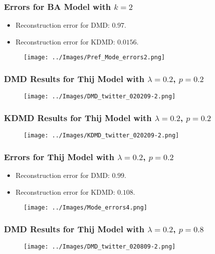 \documentclass{beamer}
\begin{document}
\begin{frame}
    \frametitle{Errors for BA Model with $k=2$}
    \begin{itemize}
        \item  Reconstruction error for DMD: $0.97$. 
        \item  Reconstruction error for KDMD: $0.0156$.
    \end{itemize}
   
    \begin{figure}
        \texttt{[image: ../Images/Pref\_Mode\_errors2.png]}
        \centering
    \end{figure}
\end{frame}

\begin{frame}
    \frametitle{DMD Results for Thij Model with $\lambda=0.2$, $p=0.2$}
    \begin{figure}
        \texttt{[image: ../Images/DMD\_twitter\_020209-2.png]}
        \centering
    \end{figure}
\end{frame}

\begin{frame}
    \frametitle{KDMD Results for Thij Model with $\lambda=0.2$, $p=0.2$}
    \begin{figure}
        \texttt{[image: ../Images/KDMD\_twitter\_020209-2.png]}
        \centering
    \end{figure}
\end{frame}

\begin{frame}
    \frametitle{Errors for Thij Model with $\lambda=0.2$, $p=0.2$}
    \begin{itemize}
        \item  Reconstruction error for DMD: $0.99$. 
        \item  Reconstruction error for KDMD: $0.108$.
    \end{itemize}
   
    \begin{figure}
        \texttt{[image: ../Images/Mode\_errors4.png]}
        \centering
    \end{figure}
\end{frame}
\begin{frame}
    \frametitle{DMD Results for Thij Model with $\lambda=0.2$, $p=0.8$}
    \begin{figure}
        \texttt{[image: ../Images/DMD\_twitter\_020809-2.png]}
        \centering
    \end{figure}
\end{frame}
\end{document}
